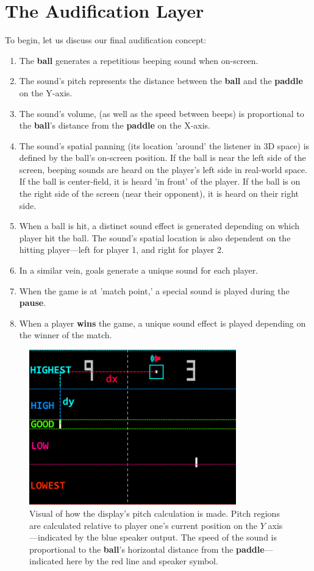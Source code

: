 \documentclass{report}
\newcommand{\state}[1]{\textbf{#1}}
\newcommand{\pad}{\textbf{paddle}\xspace}
\newcommand{\ball}{\textbf{ball}\xspace}
\begin{document}
\section{The Audification Layer}
To begin, let us discuss our final audification concept:

\begin{enumerate}
    \item The \ball generates a repetitious beeping sound when on-screen.
    \item The sound's pitch represents the distance between the \ball and the \pad on the Y-axis.
    \item The sound's volume, (as well as the speed between beeps) is proportional to the \ball's distance from the \pad on the X-axis.
    \item The sound's spatial panning (its location 'around' the listener in 3D space) is defined by the ball's on-screen position. If the ball is near the left side of the screen, beeping sounds are heard on the player's left side in real-world space. If the ball is center-field, it is heard 'in front' of the player. If the ball is on the right side of the screen (near their opponent), it is heard on their right side.  
    \item When a ball is hit, a distinct sound effect is generated depending on which player hit the ball. The sound's spatial location is also dependent on the hitting player---left for player 1, and right for player 2.
    \item In a similar vein, goals generate a unique sound for each player.
    \item When the game is at 'match point,' a special sound is played during the \state{pause}.
    \item When a player \state{wins} the game, a unique sound effect is played depending on the winner of the match.
\end{enumerate}

\begin{figure}[ht]
    \centering
    \includegraphics[width=0.8\textwidth]{soundExp.png}
    \caption{Visual of how the display's pitch calculation is made. Pitch regions are calculated relative to player one's current position on the $Y$ axis---indicated by the {\color{brightblue} blue} speaker output. The speed of the sound is proportional to the \ball's horizontal distance from the \pad---indicated here by the {\color{red}red} line and speaker symbol. }
    \label{fig:soundExp}
\end{figure}
\end{document}
